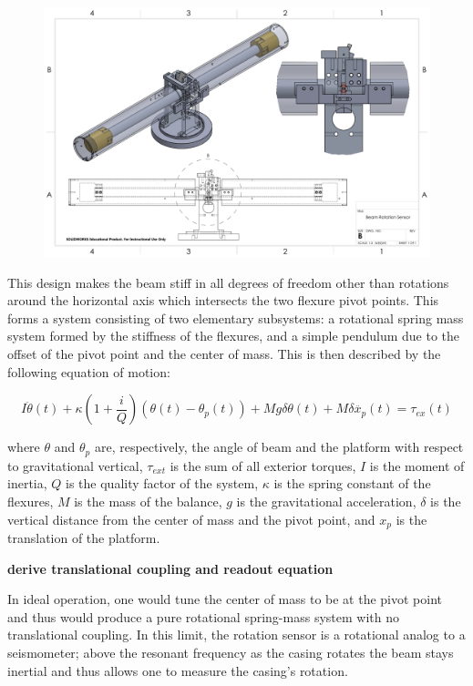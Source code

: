 \documentclass [12pt, proquest]{uwthesis}[2019]
\begin{document}
\begin{figure}%
\begin{center}
\includegraphics[width=\textwidth]{BRS_Drawing.PDF}
\caption{}
\label{BRS}
\end{center}
\end{figure}

This design makes the beam stiff in all degrees of freedom other than rotations around the horizontal axis which intersects the two flexure pivot points. This forms a system consisting of two elementary subsystems: a rotational spring mass system formed by the stiffness of the flexures, and a simple pendulum due to the offset of the pivot point and the center of mass. This is then described by the following equation of motion: \cite{venk2014}

\[I \ddot{\theta}(t)+\kappa (1+ \frac{i}{Q})(\theta(t)-\theta_p(t))+M g \delta \theta(t) +M \delta \ddot{x_p}(t)=\tau_{ex}(t)\]

where $\theta$ and $\theta_p$ are, respectively, the angle of beam and the platform with respect to gravitational vertical, $\tau_{ext}$ is the sum of all exterior torques, $I$ is the moment of inertia, $Q$ is the quality factor of the system, $\kappa$ is the spring constant of the flexures, $M$ is the mass of the balance, $g$ is the gravitational acceleration, $\delta$ is the vertical distance from the center of mass and the pivot point, and $x_p$ is the translation of the platform.

\textbf{derive translational coupling and readout equation}

In ideal operation, one would tune the center of mass to be at the pivot point and thus would produce a pure rotational spring-mass system with no translational coupling. In this limit, the rotation sensor is a rotational analog to a seismometer; above the resonant frequency as the casing rotates the beam stays inertial and thus allows one to measure the casing's rotation.
\end{document}
